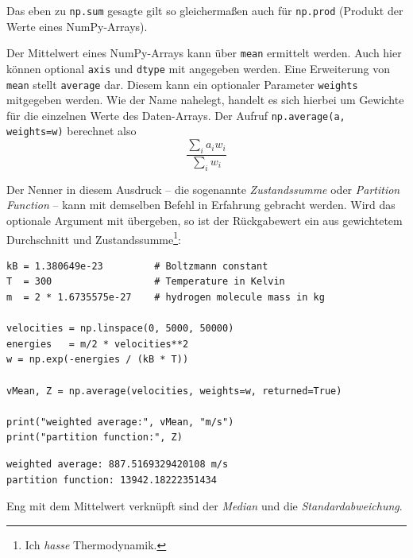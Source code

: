 Das eben zu \texttt{np.sum} gesagte gilt so gleichermaßen auch für \texttt{np.prod} (Produkt der Werte eines NumPy-Arrays).

Der Mittelwert eines NumPy-Arrays kann über \texttt{mean} ermittelt werden. Auch hier können optional \texttt{axis} und \texttt{dtype} mit angegeben werden. Eine Erweiterung von \texttt{mean} stellt \texttt{average} dar. Diesem kann ein optionaler Parameter \texttt{weights} mitgegeben werden. Wie der Name nahelegt, handelt es sich hierbei um Gewichte für die einzelnen Werte des Daten-Arrays. Der Aufruf \texttt{np.average(a, weights=w)} berechnet also
\[ \frac{\sum_i a_i w_i}{\sum_i w_i}\]

Der Nenner in diesem Ausdruck -- die sogenannte \emph{Zustandssumme} oder \emph{Partition Function} -- kann mit demselben Befehl in Erfahrung gebracht werden. Wird das optionale Argument  mit übergeben, so ist der Rückgabewert ein  aus gewichtetem Durchschnitt und Zustandssumme\footnote{Ich \emph{hasse} Thermodynamik.}:

\begin{codebox}
\begin{verbatim}
kB = 1.380649e-23         # Boltzmann constant
T  = 300                  # Temperature in Kelvin
m  = 2 * 1.6735575e-27    # hydrogen molecule mass in kg

velocities = np.linspace(0, 5000, 50000)
energies   = m/2 * velocities**2
w = np.exp(-energies / (kB * T))

vMean, Z = np.average(velocities, weights=w, returned=True)

print("weighted average:", vMean, "m/s")
print("partition function:", Z)
\end{verbatim}
\end{codebox}
%
\begin{cmdbox}
\begin{verbatim}
weighted average: 887.5169329420108 m/s
partition function: 13942.18222351434
\end{verbatim}
\end{cmdbox}

Eng mit dem Mittelwert verknüpft sind der \emph{Median} und die \emph{Standardabweichung}. 

